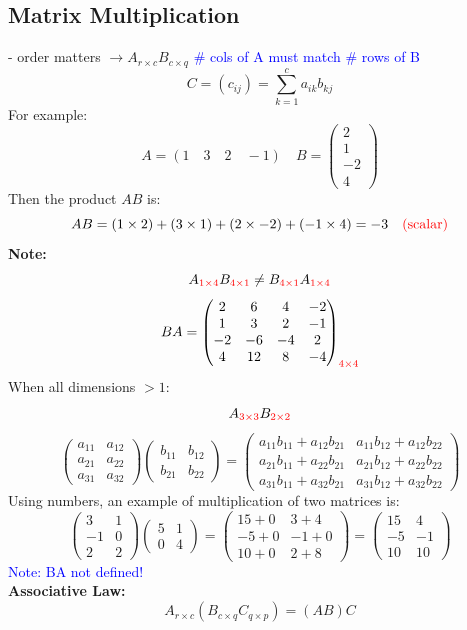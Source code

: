 \documentclass[14pt]{extarticle}
\begin{document}
\subsection*{Matrix Multiplication}

\noindent
- order matters 
$\rightarrow A_{r \times c} B_{c \times q}$ 
\textcolor{blue}{\# cols of A must match \# rows of B}
\[
C = (c_{ij}) = \sum_{k=1}^{c} a_{ik} b_{kj}
\]
For example:
\[
A = (1 \quad 3 \quad 2 \quad -1) \quad B = \begin{pmatrix} 2 \\ 1 \\ -2 \\ 4 \end{pmatrix}
\]
Then the product $AB$ is:
\[
AB = (1 \times 2) + (3 \times 1) + (2 \times -2) + (-1 \times 4) = -3
\quad \textcolor{red}{\text{(scalar)}}
\]
\textbf{Note:}
\[
A_{\textcolor{red}{1 \times 4}}B_{\textcolor{red}{4 \times 1}} \neq B_{\textcolor{red}{4 \times 1}}A_{\textcolor{red}{1 \times 4}}
\]
\[
BA = 
\begin{pmatrix}
2 & 6 & 4 & -2 \\
1 & 3 & 2 & -1 \\
-2 & -6 & -4 & 2 \\
4 & 12 & 8 & -4
\end{pmatrix}_{\textcolor{red}{4 \times 4}}
\]
When all dimensions $> 1$:
\[
A_{\textcolor{red}{3 \times 3}}B_{\textcolor{red}{2 \times 2}}
\]
\[
\begin{pmatrix}
a_{11} & a_{12} \\
a_{21} & a_{22} \\
a_{31} & a_{32}
\end{pmatrix}
\begin{pmatrix}
b_{11} & b_{12} \\
b_{21} & b_{22}
\end{pmatrix}
=
\begin{pmatrix}
a_{11}b_{11} + a_{12}b_{21} & a_{11}b_{12} + a_{12}b_{22} \\
a_{21}b_{11} + a_{22}b_{21} & a_{21}b_{12} + a_{22}b_{22} \\
a_{31}b_{11} + a_{32}b_{21} & a_{31}b_{12} + a_{32}b_{22}
\end{pmatrix}
\]
Using numbers, an example of multiplication of two matrices is:
\[
\begin{pmatrix}
3 & 1 \\
-1 & 0 \\
2 & 2
\end{pmatrix}
\begin{pmatrix}
5 & 1 \\
0 & 4
\end{pmatrix}
=
\begin{pmatrix}
15 + 0 & 3 + 4 \\
-5 + 0 & -1 + 0 \\
10 + 0 & 2 + 8
\end{pmatrix}
=
\begin{pmatrix}
15 & 4 \\
-5 & -1 \\
10 & 10
\end{pmatrix}
\]
\textcolor{blue}{Note: BA not defined!}\\
\textbf{Associative Law:}
\[
A_{r \times c} (B_{c \times q} C_{q \times p}) = (A B) C
\]
\end{document}
